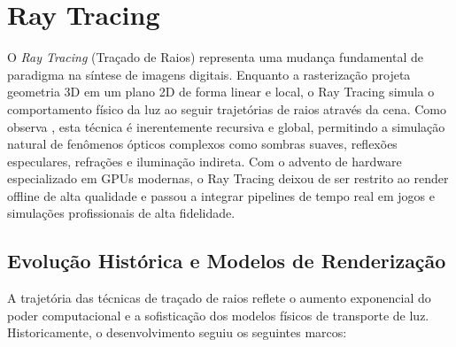\chapter{Ray Tracing}

O \textit{Ray Tracing} (Traçado de Raios) representa uma mudança fundamental de paradigma na síntese de imagens digitais. Enquanto a rasterização projeta geometria 3D em um plano 2D de forma linear e local, o Ray Tracing simula o comportamento físico da luz ao seguir trajetórias de raios através da cena. Como observa \textcite{shirley2021fundamentals}, esta técnica é inerentemente recursiva e global, permitindo a simulação natural de fenômenos ópticos complexos como sombras suaves, reflexões especulares, refrações e iluminação indireta. Com o advento de hardware especializado em GPUs modernas, o Ray Tracing deixou de ser restrito ao render offline de alta qualidade e passou a integrar pipelines de tempo real em jogos e simulações profissionais de alta fidelidade.

\section{Evolução Histórica e Modelos de Renderização}

A trajetória das técnicas de traçado de raios reflete o aumento exponencial do poder computacional e a sofisticação dos modelos físicos de transporte de luz. Historicamente, o desenvolvimento seguiu os seguintes marcos:

